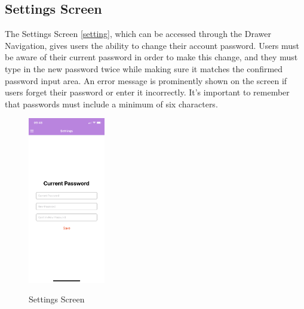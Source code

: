 \subsection{Settings Screen}
The Settings Screen \ref{setting}, which can be accessed through the Drawer Navigation, gives users the ability to change their account password. Users must be aware of their current password in order to make this change, and they must type in the new password twice while making sure it matches the confirmed password input area. An error message is prominently shown on the screen if users forget their password or enter it incorrectly. It's important to remember that passwords must include a minimum of six characters.
\begin{figure}[h!]
    \includegraphics[width=0.3\textwidth]
    {images/Setting.png}
    \centering
    \label{image:setting}
    \caption{Settings Screen}
\end{figure}

